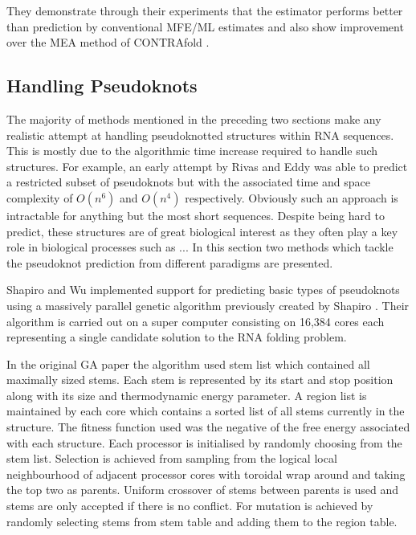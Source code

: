 \documentclass[journal]{IEEEtran}
\begin{document}
They demonstrate through their experiments that the estimator performs better than prediction by conventional MFE/ML estimates and also show improvement over the MEA method of CONTRAfold \cite{do2006contrafold}.


\subsection{Handling Pseudoknots}
\label{subsec:secondary-pseudoknots}
The majority of methods mentioned in the preceding two sections make any realistic attempt at handling pseudoknotted structures within RNA sequences. This is mostly due to the algorithmic time increase required to handle such structures. For example, an early attempt by Rivas and Eddy \cite{rivas1999dynamic} was able to predict a restricted subset of pseudoknots but with the associated time and space complexity of $O(n^6)$ and $O(n^4)$ respectively. Obviously such an approach is intractable for anything but the most short sequences. Despite being hard to predict, these structures are of great biological interest as they often play a key role in biological processes \cite{citation required} such as ... In this section two methods which tackle the pseudoknot prediction from different paradigms are presented.

Shapiro and Wu \cite{shapiro1997predicting} implemented support for predicting basic types of pseudoknots using a massively parallel genetic algorithm previously created by Shapiro \cite{shapiro1994massively}. Their algorithm is carried out on a super computer consisting on 16,384 cores each representing a single candidate solution to the RNA folding problem.

In the original GA paper \cite{shapiro1994massively} the algorithm used stem list which contained all maximally sized stems. Each stem is represented by its start and stop position along with its size and thermodynamic energy parameter. A region list is maintained by each core which contains a sorted list of all stems currently in the structure. The fitness function used was the negative of the free energy associated with each structure. Each processor is initialised by randomly choosing from the stem list. Selection is achieved from sampling from the logical local neighbourhood of adjacent processor cores with toroidal wrap around and taking the top two as parents. Uniform crossover of stems between parents is used and stems are only accepted if there is no conflict. For mutation is achieved by randomly selecting stems from stem table and adding them to the region table.
\end{document}
